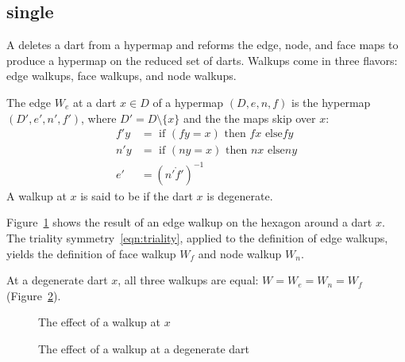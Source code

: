 \subsection{single}

A  deletes
a dart from a hypermap and reforms the edge, node, and face
maps to produce a hypermap on the reduced set of darts.  Walkups
come in three flavors: edge walkups, face walkups,
and node walkups.

\begin{definition}
The edge 
$W_e$ at  a dart $x\in D$ of a hypermap $(D,e,n,f)$ is the hypermap
$(D',e',n',f')$, where $D' = D\setminus\{x\}$ and the
the maps skip over $x$:
\begin{displaymath}
\begin{array}{lll}
f' y &= \text{ if } (f y =  x) \text{ then } f x \text{ else
} f y\\
n' y &= \text{ if } (n y = x) \text{ then } n x \text{ else
} n y\\
e' &= (n'\ocirc f')^{-1}
\end{array}
\end{displaymath}
A walkup at $x$ is said to be  if the dart $x$ is
degenerate.  
%
%
%
%
%
\end{definition}

Figure~\ref{fig:walk} shows
the result of an edge walkup on the hexagon around a dart $x$.
The triality symmetry~\ref{eqn:triality}, applied to the definition
of edge walkups, yields the definition of
face walkup $W_f$ and node walkup $W_n$.  

At a degenerate dart $x$, all three walkups are equal:
$W=W_e=W_n=W_f$ (Figure~\ref{fig:walkdegen}).
%
%

\begin{figure}[htb]
\centering
{}
\caption{The effect of a walkup at $x$}
\label{fig:walk}
\end{figure}


\begin{figure}[htb]
\centering
{}
\caption{The effect of a walkup at a degenerate dart}
\label{fig:walkdegen}
\end{figure}


